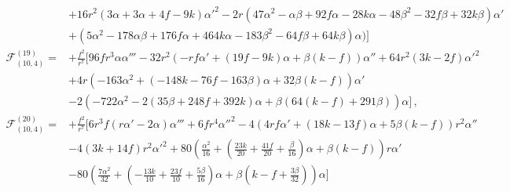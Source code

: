 \documentclass[11pt]{article}
\begin{document}
{\begin{align}
\nonumber
\\
&+ 16 r^2 \left(  3 \alpha + 3 \alpha + 4 f - 9 k \right) \alpha'^2 - 2 r \left(47 \alpha^2 - \alpha \beta + 92 f \alpha - 28 k \alpha - 48 \beta^2 - 32 f \beta + 32 k \beta \right) \alpha' 
\nonumber
\\
&+ \left( 5 \alpha^2 - 178 \alpha \beta + 176 f \alpha + 464 k \alpha - 183 \beta^2 - 64 f \beta + 64 k \beta \right) \alpha \bigg) \bigg]
\\
\mathcal{F}_{(10, 4)}^{(19)} =&+ \frac{f^2  }{r^7} \bigg[96 f r^3 \alpha \alpha''' - 32 r^2 \left(-r f \alpha' + (19f - 9k) \alpha + \beta (k-f) \right) \alpha'' +  64 r^2 \left(3k-2f \right) \alpha'^2 
\nonumber
\\
&+  4 r \left(-163 \alpha^2 + \left(-148 k - 76 f - 163 \beta \right) \alpha + 32 \beta (k-f) \right) \alpha' 
\nonumber
\\
&- 2  \left( - 722 \alpha^2 - 2 \left( 35 \beta + 248 f + 392 k \right)  \alpha  + \beta \left(64(k-f) + 291 \beta \right) \right) \alpha\bigg] \, ,
\\
\mathcal{F}_{(10, 4)}^{(20)} =&+ \frac{f^2}{r^7} \bigg[ 6 r^3 f \left( r \alpha' - 2 \alpha \right) \alpha''' + 6 f r^4 \alpha''^2 - 4 \left( 4 r f \alpha'  + \left( 18 k - 13 f \right) \alpha + 5 \beta(k-f) \right)r^2 \alpha'' 
\nonumber
\\
&- 4 \left(3 k + 14 f \right) r^2 \alpha'^2 + 80 \left( \frac{\alpha^2}{16} + \left( \frac{23 k}{20} + \frac{41 f}{20} + \frac{\beta}{16} \right) \alpha  + \beta(k-f) \right) r \alpha' 
\nonumber
\\
&- 80 \left( \frac{7 \alpha^2}{32} + \left(-\frac{13 k}{10} +  \frac{23 f}{10} + \frac{5 \beta}{16} \right)\alpha + \beta \left( k -f  + \frac{3 \beta}{32} \right) \right) \alpha \bigg]
\\

\end{align}}
\end{document}
